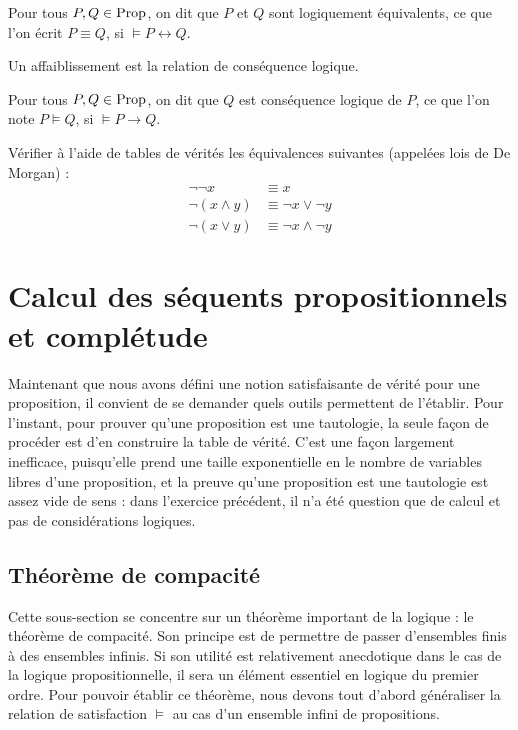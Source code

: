 \begin{definition}
  Pour tous $P,Q\in\operatorname{Prop}$, on dit que $P$ et $Q$ sont logiquement équivalents,
  ce que l'on écrit $P\equiv Q$, si $\models P \leftrightarrow Q$.
\end{definition}

Un affaiblissement est la relation de conséquence logique.

\begin{definition}
  Pour tous $P,Q\in\operatorname{Prop}$, on dit que $Q$ est conséquence logique de $P$, ce que
  l'on note $P\vDash Q$, si $\models P\to Q$.
\end{definition}

\begin{exercise}
  Vérifier à l'aide de tables de vérités les équivalences suivantes (appelées
  lois de De Morgan) :
  \begin{align*}
    \lnot\lnot x &\equiv x\\
    \lnot (x \land y) &\equiv \lnot x \lor \lnot y\\
    \lnot (x \lor y) &\equiv \lnot x \land \lnot y
  \end{align*}
\end{exercise}

\section[Séquents propositionnels]{Calcul des séquents propositionnels et
  complétude}

Maintenant que nous avons défini une notion satisfaisante de vérité pour une
proposition, il convient de se demander quels outils permettent de l'établir.
Pour l'instant, pour prouver qu'une proposition est une tautologie, la seule
façon de procéder est d'en construire la table de vérité. C'est une façon
largement inefficace, puisqu'elle prend une taille exponentielle en le nombre de
variables libres d'une proposition, et la preuve qu'une proposition est une
tautologie est assez vide de sens : dans l'exercice précédent, il n'a été
question que de calcul et pas de considérations logiques.

\subsection{Théorème de compacité}

Cette sous-section se concentre sur un théorème important de la logique : le
théorème de compacité. Son principe est de permettre de passer d'ensembles finis
à des ensembles infinis. Si son utilité est relativement anecdotique dans le cas
de la logique propositionnelle, il sera un élément essentiel en logique du
premier ordre. Pour pouvoir établir ce théorème, nous devons tout d'abord
généraliser la relation de satisfaction $\vDash$ au cas d'un ensemble infini de
propositions.

